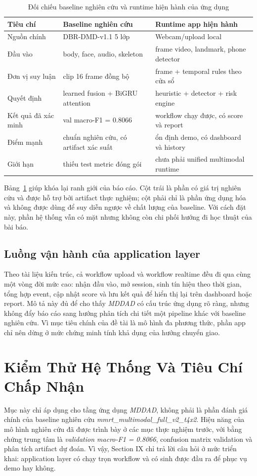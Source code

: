 \documentclass[conference,a4paper]{IEEEtran}
\begin{document}
\begin{table}[t]
\caption{Đối chiếu baseline nghiên cứu và runtime hiện hành của ứng dụng}
\label{tab:research-vs-app}
\centering
\small
\begin{tabular}{p{2.1cm}p{2.75cm}p{2.75cm}}
\toprule
Tiêu chí & Baseline nghiên cứu & Runtime app hiện hành \\
\midrule
Nguồn chính & DBR-DMD-v1.1 5 lớp & Webcam/upload local \\
Đầu vào & body, face, audio, skeleton & frame video, landmark, phone detector \\
Đơn vị suy luận & clip 16 frame đồng bộ & frame + temporal rules theo cửa sổ \\
Quyết định & learned fusion + BiGRU attention & heuristic + detector + risk engine \\
Kết quả đã xác minh & val macro-F1 = 0.8066 & workflow chạy được, có score và report \\
Điểm mạnh & chuẩn nghiên cứu, có artifact xác suất & ổn định demo, có dashboard và history \\
Giới hạn & thiếu test metric đóng gói & chưa phải unified multimodal runtime \\
\bottomrule
\end{tabular}
\end{table}

Bảng~\ref{tab:research-vs-app} giúp khóa lại ranh giới của báo cáo. Cột trái là phần có giá trị nghiên cứu và được hỗ trợ bởi artifact thực nghiệm; cột phải chỉ là phần ứng dụng hóa và không được dùng để suy diễn ngược về chất lượng của baseline. Với cách đặt này, phần hệ thống vẫn có mặt nhưng không còn chi phối hướng đi học thuật của bài báo.

\subsection{Luồng vận hành của application layer}
Theo tài liệu kiến trúc, cả workflow upload và workflow realtime đều đi qua cùng một vòng đời mức cao: nhận đầu vào, mở session, sinh tín hiệu theo thời gian, tổng hợp event, cập nhật score và lưu kết quả để hiển thị lại trên dashboard hoặc report. Mô tả này đủ để cho thấy \textit{MDDAD} có cấu trúc ứng dụng rõ ràng, nhưng không đẩy báo cáo sang hướng phân tích chi tiết một pipeline khác với baseline nghiên cứu. Vì mục tiêu chính của đề tài là mô hình đa phương thức, phần app chỉ nên dừng ở mức chứng minh tính khả dụng của hướng chuyển giao.

\section[Kiem Thu He Thong Va Tieu Chi Chap Nhan]{Kiểm Thử Hệ Thống Và Tiêu Chí Chấp Nhận}
Mục này chỉ áp dụng cho tầng ứng dụng \textit{MDDAD}, không phải là phần đánh giá chính của baseline nghiên cứu \textit{mmrt\_multimodal\_full\_v2\_t4x2}. Hiệu năng của mô hình nghiên cứu đã được trình bày ở các mục thực nghiệm trước, với bằng chứng trung tâm là \textit{validation macro-F1 = 0.8066}, confusion matrix validation và phân tích artifact dự đoán. Vì vậy, Section IX chỉ trả lời câu hỏi ở mức triển khai: application layer có chạy trọn workflow và có sinh được đầu ra để phục vụ demo hay không.
\end{document}
